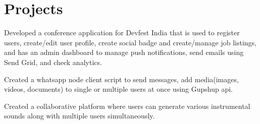 \documentclass[]{deedy-resume-openfont}
\begin{document}
\begin{minipage}[t]{0.71\textwidth}   

\vspace*{-2mm}
\section{Projects} 
\vspace*{4mm}
\begin{tightemize}
\item Developed a conference application for Devfest India that is used to register users, create/edit user profile, create social badge and create/manage job listings, and has an admin dashboard to manage push notifications, send emails using Send Grid, and check analytics.
\end{tightemize}
\sectionsep

\begin{tightemize}
\item Created a whatsapp node client script to send messages, add media(images, videos, documents) to single or multiple users at once using Gupshup api.
\end{tightemize}
\sectionsep

\begin{tightemize}
\item Created a collaborative platform where users can generate various instrumental sounds along with multiple users simultaneously.
\end{tightemize}
\sectionsep


\end{minipage}
\end{document}
